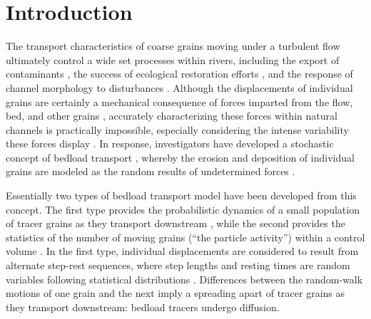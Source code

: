 \documentclass[draft]{agujournal2018}
\begin{document}
\section{Introduction}
The transport characteristics of coarse grains moving under a turbulent flow ultimately control a wide set processes within rivers, including the export of contaminants \citep{Malmon2005,Macklin2006}, the success of ecological restoration efforts \citep{Gaeuman2017}, and the response of channel morphology to disturbances \citep{Hassan2017}.
Although the displacements of individual grains are certainly a mechanical consequence of forces imparted from the flow, bed, and other grains \citep{Wiberg1985, Vowinckel2014,Gonzalez2017}, accurately characterizing these forces within natural channels is practically impossible, especially considering the intense variability these forces display \citep{Schmeeckle2007,Celik2010, Dwivedi2011}. In response, investigators have developed a stochastic concept of bedload transport \citep{Einstein1937}, whereby the erosion and deposition of individual grains are modeled as the random results of undetermined forces \citep{Einstein1950,Paintal1971,Ancey2006}.

Essentially two types of bedload transport model have been developed from this concept. 
The first type provides the probabilistic dynamics of a small population of tracer grains as they transport downstream \citep{Einstein1937,Hubbell1964, Nakagawa1976,Martin2012,Lajeunesse2018,Wu2019}, while the second provides the statistics of the number of moving grains (``the particle activity'') within a control volume \citep{Einstein1950,Ancey2006,Ancey2008,Furbish2012a}.
In the first type, individual displacements are considered to result from alternate step-rest sequences, where step lengths and resting times are random variables following statistical distributions \citep{Einstein1937}. 
Differences between the random-walk motions of one grain and the next imply a spreading apart of tracer grains as they transport downstream: bedload tracers undergo diffusion.
\end{document}
